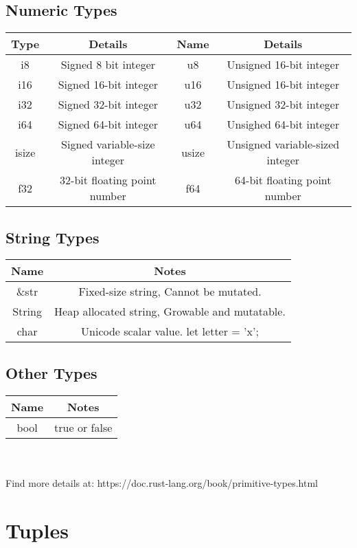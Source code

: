 \documentclass[a0,final]{a0poster}
\begin{document}
\begin{multicols}{3}
\subsection*{Numeric Types}
\begin{tabular}{ c|c|c|c }
  Type & Details & Name & Details \\
  \hline
    i8 & Signed 8 bit integer & u8 & Unsigned 16-bit integer\\
    i16 & Signed 16-bit integer & u16 & Unsigned 16-bit integer\\
    i32 & Signed 32-bit integer & u32 & Unsigned 32-bit integer \\
    i64 & Signed 64-bit integer & u64 & Unsighed 64-bit integer \\
    \hline\hline
    isize & Signed variable-size integer & usize & Unsigned variable-sized integer \\
    \hline\hline
    f32 & 32-bit floating point number  & f64 & 64-bit floating point number\\
\end{tabular}

\subsection*{String Types}
\begin{tabular}{ c|c }
  Name & Notes \\
  \hline
  \&str & Fixed-size string, Cannot be mutated. \\
  String & Heap allocated string, Growable and mutatable.\\
  char & Unicode scalar value. let letter = 'x';\\
\end{tabular}

\subsection*{Other Types}
\begin{tabular}{ c|c }
  Name & Notes \\
  \hline
  bool & true or false \\
\end{tabular}
\\\\
Find more details at: https://doc.rust-lang.org/book/primitive-types.html

\section*{Tuples}




\end{multicols}
\end{document}
